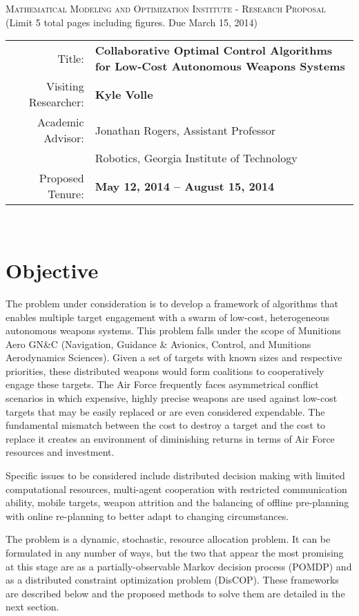\documentclass{article}
\begin{document}
\begin{center}
\textsc{Mathematical Modeling and Optimization Institute - Research Proposal}\\ \textnormal{(Limit 5 total pages including figures.  Due March 15, 2014)}
\bigskip\\
\end{center}


\begin{tabular}{rl}
Title: & \textbf{Collaborative Optimal Control Algorithms for Low-Cost Autonomous Weapons Systems}\\
Visiting Researcher: & \textbf{Kyle Volle}\\
Academic Advisor: & Jonathan Rogers, Assistant Professor\\
                  & Robotics, Georgia Institute of Technology\\
Proposed Tenure:& \textbf{May 12, 2014 -- August 15, 2014}\\
\end{tabular}
\bigskip\\

	
\section{Objective}
The problem under consideration is to develop a framework of algorithms that enables multiple target engagement with a swarm of low-cost, heterogeneous autonomous weapons systems. This problem falls under the scope of Munitions Aero GN\&C (Navigation, Guidance \& Avionics, Control, and Munitions Aerodynamics Sciences). Given a set of targets with known sizes and respective priorities, these distributed weapons would form coalitions to cooperatively engage these targets. The Air Force frequently faces asymmetrical conflict scenarios in which expensive, highly precise weapons are used against low-cost targets that may be easily replaced or are even considered expendable. The fundamental mismatch between the cost to destroy a target and the cost to replace it creates an environment of diminishing returns in terms of Air Force resources and investment.

Specific issues to be considered include distributed decision making with limited computational resources, multi-agent cooperation with restricted communication ability, mobile targets, weapon attrition and the balancing of offline pre-planning with online re-planning to better adapt to changing circumstances.

The problem is a dynamic, stochastic, resource allocation problem. It can be formulated in any number of ways, but the two that appear the most promising at this stage are as a partially-observable Markov decision process (POMDP) and as a distributed constraint optimization problem (DisCOP). These frameworks are described below and the proposed methods to solve them are detailed in the next section.
\end{document}
